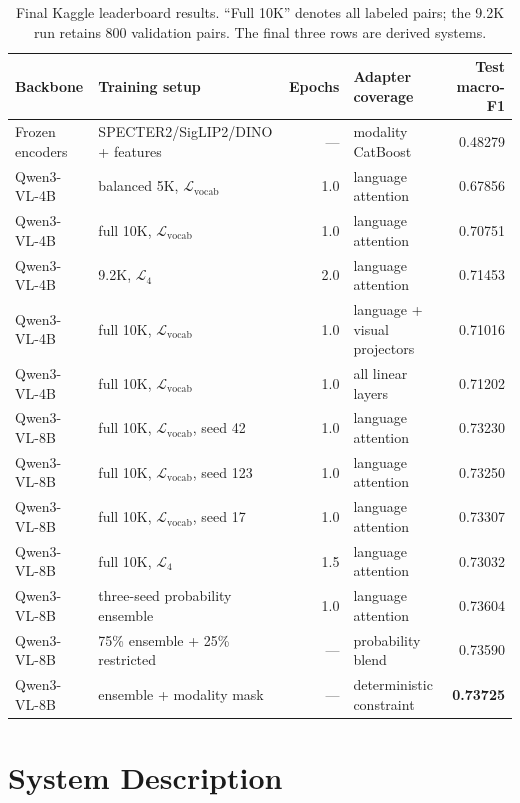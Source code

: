 \documentclass[11pt]{article}
\begin{document}
\begin{table}[t]
\centering
\footnotesize
\setlength{\tabcolsep}{3pt}
\begin{tabular}{llrlr}
\toprule
Backbone & Training setup & Epochs & Adapter coverage & Test macro-F1 \\
\midrule
Frozen encoders & SPECTER2/SigLIP2/DINO + features & --- & modality CatBoost & 0.48279 \\
Qwen3-VL-4B & balanced 5K, $\mathcal{L}_{\mathrm{vocab}}$ & 1.0 & language attention & 0.67856 \\
Qwen3-VL-4B & full 10K, $\mathcal{L}_{\mathrm{vocab}}$ & 1.0 & language attention & 0.70751 \\
Qwen3-VL-4B & 9.2K, $\mathcal{L}_{4}$ & 2.0 & language attention & 0.71453 \\
Qwen3-VL-4B & full 10K, $\mathcal{L}_{\mathrm{vocab}}$ & 1.0 & language + visual projectors & 0.71016 \\
Qwen3-VL-4B & full 10K, $\mathcal{L}_{\mathrm{vocab}}$ & 1.0 & all linear layers & 0.71202 \\
Qwen3-VL-8B & full 10K, $\mathcal{L}_{\mathrm{vocab}}$, seed 42 & 1.0 & language attention & 0.73230 \\
Qwen3-VL-8B & full 10K, $\mathcal{L}_{\mathrm{vocab}}$, seed 123 & 1.0 & language attention & 0.73250 \\
Qwen3-VL-8B & full 10K, $\mathcal{L}_{\mathrm{vocab}}$, seed 17 & 1.0 & language attention & 0.73307 \\
Qwen3-VL-8B & full 10K, $\mathcal{L}_{4}$ & 1.5 & language attention & 0.73032 \\
Qwen3-VL-8B & three-seed probability ensemble & 1.0 & language attention & 0.73604 \\
Qwen3-VL-8B & 75\% ensemble + 25\% restricted & --- & probability blend & 0.73590 \\
Qwen3-VL-8B & ensemble + modality mask & --- & deterministic constraint & \textbf{0.73725} \\
\bottomrule
\end{tabular}
\caption{Final Kaggle leaderboard results.  ``Full 10K'' denotes all labeled pairs; the 9.2K run retains 800 validation pairs.  The final three rows are derived systems.}
\label{tab:main}
\end{table}

\section{System Description}
\end{document}
